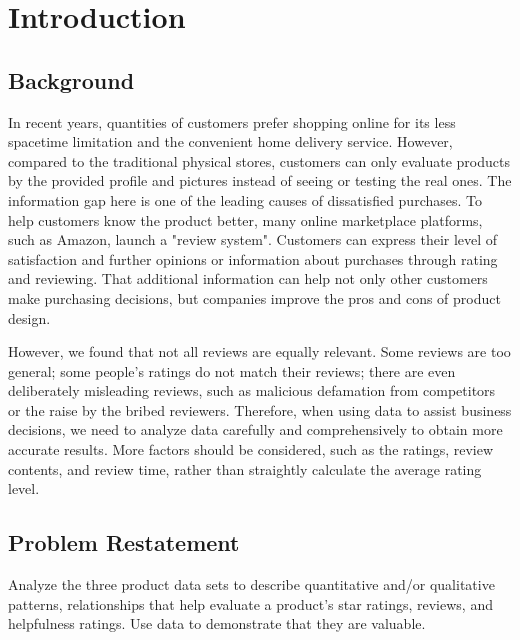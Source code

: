 \documentclass{mcmthesis}
\begin{document}
\section{ Introduction }
\subsection{Background}
In recent years, quantities of customers prefer shopping online for its less spacetime limitation and the convenient home delivery service. However, compared to the traditional physical stores, customers can only evaluate products by the provided profile and pictures instead of seeing or testing the real ones. The information gap here is one of the leading causes of dissatisfied purchases. To help customers know the product better, many online marketplace platforms, such as Amazon, launch a "review system". Customers can express their level of satisfaction and further opinions or information about purchases through rating and reviewing. That additional information can help not only other customers make purchasing decisions, but companies improve the pros and cons of product design.

However, we found that not all reviews are equally relevant. Some reviews are too general; some people's ratings do not match their reviews; there are even deliberately misleading reviews, such as malicious defamation from competitors or the raise by the bribed reviewers. Therefore, when using data to assist business decisions, we need to analyze data carefully and comprehensively to obtain more accurate results. More factors should be considered, such as the ratings, review contents, and review time, rather than straightly calculate the average rating level.

\subsection{Problem Restatement}
Analyze the three product data sets to describe quantitative and/or qualitative patterns, relationships that help evaluate a product's star ratings, reviews, and helpfulness ratings. Use data to demonstrate that they are valuable.
\end{document}
